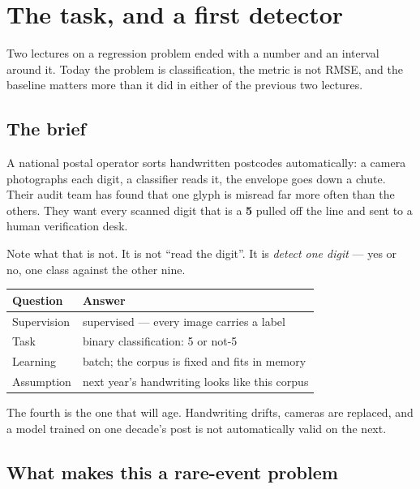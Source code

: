 \documentclass[11pt,a4paper]{article}
\begin{document}

\section{The task, and a first detector}

Two lectures on a regression problem ended with a number and an interval around
it. Today the problem is classification, the metric is not RMSE, and the
baseline matters more than it did in either of the previous two lectures.

\subsection{The brief}

A national postal operator sorts handwritten postcodes automatically: a camera
photographs each digit, a classifier reads it, the envelope goes down a chute.
Their audit team has found that one glyph is misread far more often than the
others. They want every scanned digit that is a \textbf{5} pulled off the line
and sent to a human verification desk.

Note what that is not. It is not ``read the digit''. It is \emph{detect one
digit} --- yes or no, one class against the other nine.

\begin{center}
\small
\begin{tabular}{lp{}}
\toprule
\textbf{Question} & \textbf{Answer} \\
\midrule
Supervision & supervised --- every image carries a label \\
Task        & binary classification: 5 or not-5 \\
Learning    & batch; the corpus is fixed and fits in memory \\
Assumption  & next year's handwriting looks like this corpus \\
\bottomrule
\end{tabular}
\end{center}

The fourth is the one that will age. Handwriting drifts, cameras are replaced,
and a model trained on one decade's post is not automatically valid on the
next.

\subsection{What makes this a rare-event problem}
\end{document}
